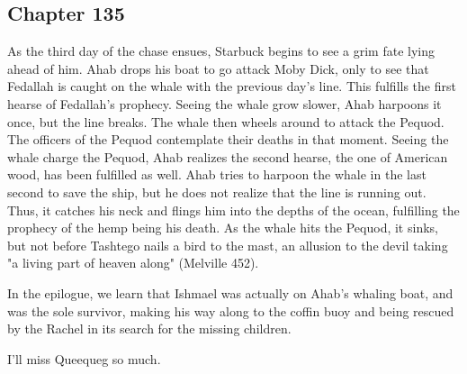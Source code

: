 \subsection{Chapter 135}

As the third day of the chase ensues, Starbuck begins to see a grim fate lying
ahead of him. Ahab drops his boat to go attack Moby Dick, only to see that
Fedallah is caught on the whale with the previous day's line. This fulfills the
first hearse of Fedallah's prophecy. Seeing the whale grow slower, Ahab
harpoons it once, but the line breaks. The whale then wheels around to attack
the Pequod. The officers of the Pequod contemplate their deaths in that moment.
Seeing the whale charge the Pequod, Ahab realizes the second hearse, the one of
American wood, has been fulfilled as well. Ahab tries to harpoon the whale in
the last second to save the ship, but he does not realize that the line is
running out. Thus, it catches his neck and flings him into the depths of the
ocean, fulfilling the prophecy of the hemp being his death. As the whale hits
the Pequod, it sinks, but not before Tashtego nails a bird to the mast, an
allusion to the devil taking "a living part of heaven along" (Melville 452).

In the epilogue, we learn that Ishmael was actually on Ahab's whaling boat, and
was the sole survivor, making his way along to the coffin buoy and being
rescued by the Rachel in its search for the missing children.

I'll miss Queequeg so much.
